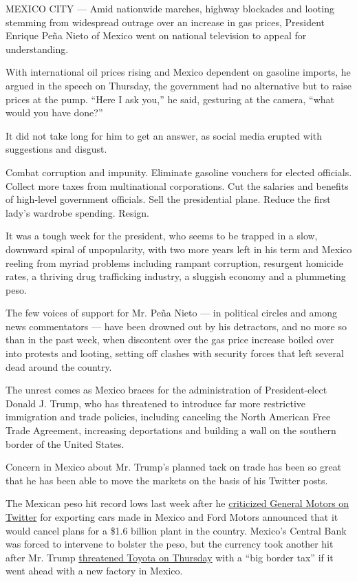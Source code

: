 MEXICO CITY --- Amid nationwide marches, highway blockades and looting
stemming from widespread outrage over an increase in gas prices,
President Enrique Peña Nieto of Mexico went on national television to
appeal for understanding.

With international oil prices rising and Mexico dependent on gasoline
imports, he argued in the speech on Thursday, the government had no
alternative but to raise prices at the pump. ``Here I ask you,'' he
said, gesturing at the camera, ``what would you have done?''

It did not take long for him to get an answer, as social media erupted
with suggestions and disgust.

Combat corruption and impunity. Eliminate gasoline vouchers for elected
officials. Collect more taxes from multinational corporations. Cut the
salaries and benefits of high-level government officials. Sell the
presidential plane. Reduce the first lady's wardrobe spending. Resign.

It was a tough week for the president, who seems to be trapped in a
slow, downward spiral of unpopularity, with two more years left in his
term and Mexico reeling from myriad problems including rampant
corruption, resurgent homicide rates, a thriving drug trafficking
industry, a sluggish economy and a plummeting peso.

The few voices of support for Mr. Peña Nieto --- in political circles
and among news commentators --- have been drowned out by his detractors,
and no more so than in the past week, when discontent over the gas price
increase boiled over into protests and looting, setting off clashes with
security forces that left several dead around the country.

The unrest comes as Mexico braces for the administration of
President-elect Donald J. Trump, who has threatened to introduce far
more restrictive immigration and trade policies, including canceling the
North American Free Trade Agreement, increasing deportations and
building a wall on the southern border of the United States.

Concern in Mexico about Mr. Trump's planned tack on trade has been so
great that he has been able to move the markets on the basis of his
Twitter posts.

The Mexican peso hit record lows last week after he
\href{https://twitter.com/realDonaldTrump/status/816260343391514624}{criticized
General Motors on Twitter} for exporting cars made in Mexico and Ford
Motors announced that it would cancel plans for a \$1.6 billion plant in
the country. Mexico's Central Bank was forced to intervene to bolster
the peso, but the currency took another hit after Mr. Trump
\href{https://twitter.com/realDonaldTrump/status/817071792711942145}{threatened
Toyota on Thursday} with a ``big border tax'' if it went ahead with a
new factory in Mexico.

